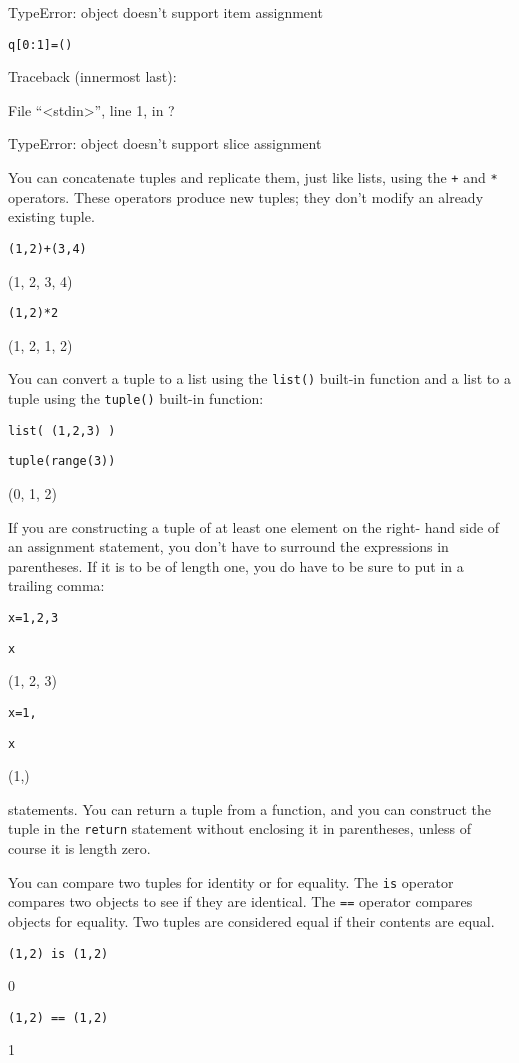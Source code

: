 TypeError: object doesn't support
item assignment


\texttt{q{[}0:1{]}=()}

Traceback (innermost last):

 File
``\textless{}stdin\textgreater{}'', line 1, in ?

TypeError: object doesn't support
slice assignment

You can concatenate tuples and
replicate them, just like lists, using the \texttt{+} and \texttt{*}
operators. These operators produce new tuples; they don't modify an
already existing tuple.


\texttt{(1,2)+(3,4)}

(1, 2, 3, 4)


\texttt{(1,2)*2}

(1, 2, 1, 2)

You can convert a tuple to a list
using the \texttt{list()} built-in function and a list to a tuple using
the \texttt{tuple()} built-in function:


\texttt{list( (1,2,3) )}




\texttt{tuple(range(3))}

(0, 1, 2)

If you are constructing a tuple of
at least one element on the right- hand side of an assignment statement,
you don't have to surround the expressions in parentheses. If it is to
be of length one, you do have to be sure to put in a trailing comma:


\texttt{x=1,2,3}


\texttt{x}

(1, 2, 3)


\texttt{x=1,}


\texttt{x}

(1,)


statements. You can return a tuple from a function, and you can
construct the tuple in the \texttt{return} statement without enclosing it
in parentheses, unless of course it is length zero.

You can compare two tuples for
identity or for equality. The \texttt{is} operator compares two objects to
see if they are identical. The \texttt{==} operator compares objects for
equality. Two tuples are considered equal if their contents are equal.


\texttt{(1,2) is (1,2)}

0


\texttt{(1,2) == (1,2)}

1

